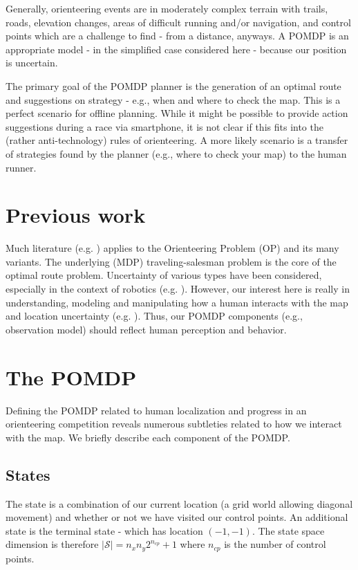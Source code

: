 \documentclass[twoside,11pt]{article}
\begin{document}
Generally, orienteering events are in moderately complex terrain with trails, roads, elevation changes, areas of difficult running and/or navigation, and control points which are a challenge to find - from a distance, anyways. A POMDP is an appropriate model - in the simplified case considered here - because our position is uncertain.

The primary goal of the POMDP planner is the generation of an optimal route and suggestions on strategy - e.g., when and where to check the map. This is a perfect scenario for offline planning. While it might be possible to provide action suggestions during a race via smartphone, it is not clear if this fits into the (rather anti-technology) rules of orienteering. A more likely scenario is a transfer of strategies found by the planner (e.g., where to check your map) to the human runner.

\section{Previous work}

Much literature (e.g. \cite{opsurvey}) applies to the Orienteering Problem (OP) and its many variants. The underlying (MDP) traveling-salesman problem is the core of the optimal route problem. Uncertainty of various types have been considered, especially in the context of robotics (e.g. \cite{figop}). However, our interest here is really in understanding, modeling and manipulating how a human interacts with the map and location uncertainty (e.g. \cite{humanop}). Thus, our POMDP components (e.g., observation model) should reflect human perception and behavior.

\section{The POMDP}

Defining the POMDP related to human localization and progress in an orienteering competition reveals numerous subtleties related to how we interact with the map. We briefly describe each component of the POMDP.

\subsection*{States}

The state is a combination of our current location (a grid world allowing diagonal movement) and whether or not we have visited our control points. An additional state is the terminal state - which has location $(-1,-1)$. The state space dimension is therefore $| \mathcal{S} | = n_x n_y 2^{n_{cp}} + 1$ where $n_{cp}$ is the number of control points.
\end{document}
